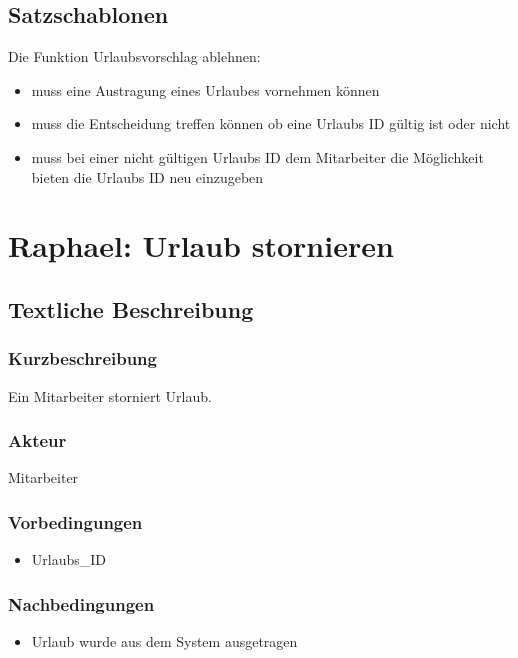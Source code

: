 \subsection{Satzschablonen}
Die Funktion Urlaubsvorschlag ablehnen:
\begin{itemize}
	\item muss eine Austragung eines Urlaubes vornehmen können
	\item muss die Entscheidung treffen können ob eine Urlaubs ID gültig ist oder nicht
	\item muss bei einer nicht gültigen Urlaubs ID dem Mitarbeiter die Möglichkeit bieten die Urlaubs ID neu einzugeben
\end{itemize}
\section{Raphael: Urlaub stornieren}
\subsection{Textliche Beschreibung}
\subsubsection{Kurzbeschreibung}
Ein Mitarbeiter storniert Urlaub.
\subsubsection{Akteur}
Mitarbeiter
\subsubsection{Vorbedingungen}
\begin{itemize}
    \item Urlaubs\_ID
\end{itemize}
\subsubsection{Nachbedingungen}
\begin{itemize}
    \item Urlaub wurde aus dem System ausgetragen
\end{itemize}
